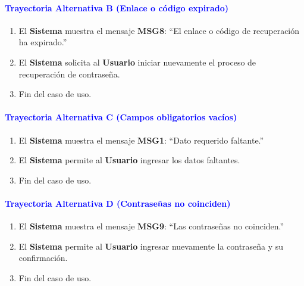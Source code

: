 \paragraph{\textbf{\textcolor{blue}{Trayectoria Alternativa B (Enlace o código expirado)}}}
\begin{enumerate}
    \item El \textbf{Sistema} muestra el mensaje \textbf{MSG8}: ``El enlace o código de recuperación ha expirado.''
    \item El \textbf{Sistema} solicita al \textbf{Usuario} iniciar nuevamente el proceso de recuperación de contraseña.
    \item Fin del caso de uso.
\end{enumerate}

\paragraph{\textbf{\textcolor{blue}{Trayectoria Alternativa C (Campos obligatorios vacíos)}}}
\begin{enumerate}
    \item El \textbf{Sistema} muestra el mensaje \textbf{MSG1}: ``Dato requerido faltante.''
    \item El \textbf{Sistema} permite al \textbf{Usuario} ingresar los datos faltantes.
    \item Fin del caso de uso.
\end{enumerate}

\paragraph{\textbf{\textcolor{blue}{Trayectoria Alternativa D (Contraseñas no coinciden)}}}
\begin{enumerate}
    \item El \textbf{Sistema} muestra el mensaje \textbf{MSG9}: ``Las contraseñas no coinciden.''
    \item El \textbf{Sistema} permite al \textbf{Usuario} ingresar nuevamente la contraseña y su confirmación.
    \item Fin del caso de uso.
\end{enumerate}

